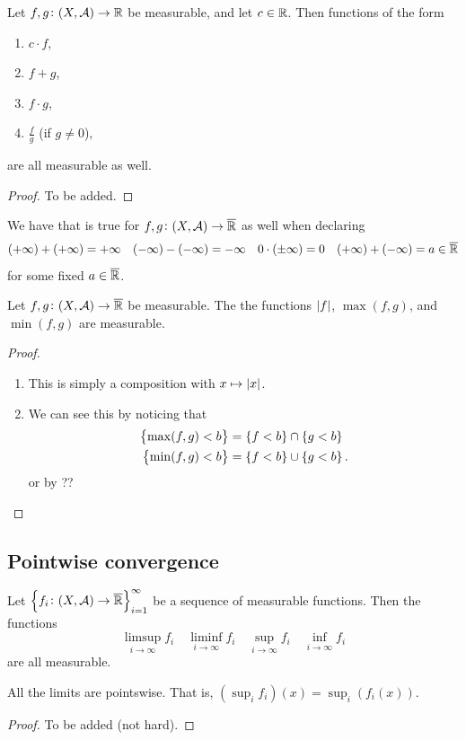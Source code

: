 \documentclass[11pt,a4paper]{article}
\newcommand{\A}{\mathcal A}
\begin{document}
\begin{proposition}
  \label{prp:measurable-functions-arithmetic}
  Let $f,g \colon (X,\A) \to \R$ be measurable, and let $c \in \mathbb{R}$.
  Then functions of the form
  \begin{enumerate}
    \item[(1)] $c \cdot f$,
    \item[(2)] $f + g$,
    \item[(3)] $f \cdot g$,
    \item[(4)] $\frac{f}{g}$ (if $g \neq 0$),
  \end{enumerate}
  are all measurable as well.
\end{proposition}
\begin{proof}
  To be added.
\end{proof}
\begin{remark}
  We have that  is true
  for $f,g \colon (X,\A) \to \overline \R$ as well when declaring
  \[
    (+\infty) + (+\infty) = +\infty \quad
    (-\infty) - (-\infty) = -\infty \quad
    0 \cdot (\pm\infty) = 0 \quad
    (+\infty) + (-\infty) = a \in \overline {\mathbb{R}}
  \]
  for some fixed $a \in \overline {\mathbb{R}}$.
\end{remark}

\begin{proposition}
  Let $f,g \colon (X,\A) \to \overline \R$ be measurable.
  The the functions $\left\lvert f\right\rvert$, $\max(f,g)$, and $\min(f,g)$ are measurable.
\end{proposition}
\begin{proof} \phantom{}
\begin{enumerate}
  \item[(1)] This is simply a composition with $x \mapsto \left\lvert x\right\rvert$.
  \item[(2 + 3)] We can see this by noticing that
  \begin{align*}
    \left\{\max(f,g) < b\right\} &= \left\{f < b\right\} \cap \left\{g < b\right\} \\
    \left\{\min(f,g) < b\right\} &= \left\{f < b\right\} \cup \left\{g < b\right\}.
  \end{align*}
  or by ??
\end{enumerate}
\end{proof}

\subsection{Pointwise convergence}
\begin{proposition}
  \label{prp:more-measurable-functions}
  Let $\set{f_i \colon (X,\A) \to \overline \R}_{i=1}^{\infty}$ be a sequence
  of measurable functions.
  Then the functions
  \[
    \limsup_{i \to \infty} f_i \quad
    \liminf_{i \to \infty} f_i \quad
    \sup_{i \to \infty} f_i \quad
    \inf_{i \to \infty} f_i
  \]
  are all measurable.
\end{proposition}
\begin{remark}
  All the limits are pointswise.
  That is, $(\sup_{i} f_i)(x) = \sup_{i}(f_i(x))$.
\end{remark}
\begin{proof}
  To be added (not hard).
\end{proof}
\end{document}
